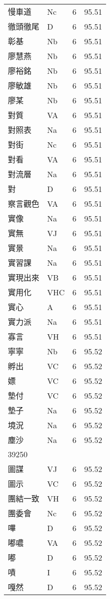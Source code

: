 \documentclass[twocolumn]{book}
\begin{document}
\begin{supertabular}{llrr}
慢車道 & Nc & 6 &  95.51\\
徹頭徹尾 & D & 6 &  95.51\\
彰基 & Nb & 6 &  95.51\\
廖慧燕 & Nb & 6 &  95.51\\
廖裕銘 & Nb & 6 &  95.51\\
廖敏雄 & Nb & 6 &  95.51\\
廖某 & Nb & 6 &  95.51\\
對質 & VA & 6 &  95.51\\
對照表 & Na & 6 &  95.51\\
對街 & Nc & 6 &  95.51\\
對看 & VA & 6 &  95.51\\
對流層 & Na & 6 &  95.51\\
對 & D & 6 &  95.51\\
察言觀色 & VA & 6 &  95.51\\
實像 & Na & 6 &  95.51\\
實無 & VJ & 6 &  95.51\\
實景 & Na & 6 &  95.51\\
實習課 & Na & 6 &  95.51\\
實現出來 & VB & 6 &  95.51\\
實用化 & VHC & 6 &  95.51\\
實心 & A & 6 &  95.51\\
實力派 & Na & 6 &  95.51\\
寡言 & VH & 6 &  95.51\\
寧寧 & Nb & 6 &  95.52\\
孵出 & VC & 6 &  95.52\\
嫖 & VC & 6 &  95.52\\
墊付 & VC & 6 &  95.52\\
墊子 & Na & 6 &  95.52\\
境況 & Na & 6 &  95.52\\
塵沙 & Na & 6 &  95.52\\
39250\\
圖謀 & VJ & 6 &  95.52\\
圖示 & VC & 6 &  95.52\\
團結一致 & VH & 6 &  95.52\\
團委會 & Nc & 6 &  95.52\\
嗶 & D & 6 &  95.52\\
嘟噥 & VA & 6 &  95.52\\
嘟 & D & 6 &  95.52\\
嘖 & I & 6 &  95.52\\
嘎然 & D & 6 &  95.52\\

\end{supertabular}
\end{document}
